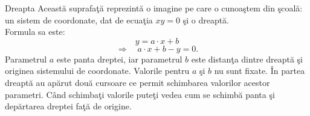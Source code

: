 \begin{surferPage}[Dreapta]{Dreapta}
Aceast\u a suprafa\c t\u a reprezint\u a o imagine pe care o cunoa\c stem din \c scoal\u a: un sistem de coordonate, dat de ecua\c tia $xy=0$ \c si o dreapt\u a. \\ Formula sa este:
\[y=a\cdot x + b\]
\[ \Rightarrow \quad a\cdot x +b -y=0.\]
Parametrul $a$ este panta dreptei, iar parametrul $b$ este distan\c ta dintre dreapt\u a \c si originea sistemului de coordonate.
\newline \newline
Valorile pentru  $a$ \c si $b$ nu sunt fixate. \^In partea dreapt\u a au ap\u arut dou\u a cursoare ce permit schimbarea valorilor acestor parametri. C\^and schimba\c ti valorile pute\c ti vedea cum se schimb\u a panta \c si dep\u artarea dreptei fa\c t\u a de origine.
\end{surferPage}
